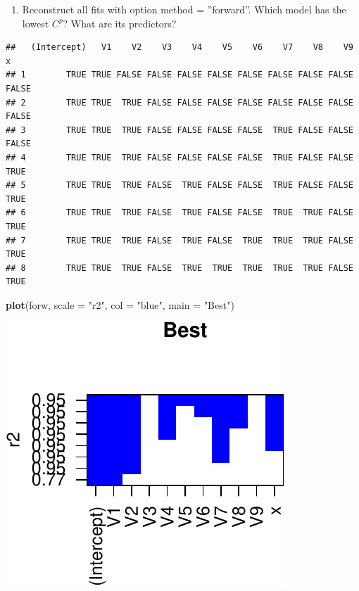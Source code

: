 \documentclass[]{article}
\newenvironment{Shaded}{\begin{snugshade}}{\end{snugshade}}
\newcommand{\DataTypeTok}[1]{\textcolor[rgb]{0.13,0.29,0.53}{#1}}
\newcommand{\KeywordTok}[1]{\textcolor[rgb]{0.13,0.29,0.53}{\textbf{#1}}}
\newcommand{\NormalTok}[1]{#1}
\newcommand{\OperatorTok}[1]{\textcolor[rgb]{0.81,0.36,0.00}{\textbf{#1}}}
\newcommand{\StringTok}[1]{\textcolor[rgb]{0.31,0.60,0.02}{#1}}
\providecommand{\tightlist}{%
  \setlength{\itemsep}{0pt}\setlength{\parskip}{0pt}}
\begin{document}
\begin{enumerate}
\def\labelenumi{(\alph{enumi})}
\setcounter{enumi}{2}
\tightlist
\item
  Reconstruct all fits with option method = ''forward''. Which model has
  the lowest \(C^p\)? What are its predictors?
\end{enumerate}

\begin{Shaded}
\end{Shaded}

\begin{verbatim}
##   (Intercept)   V1    V2    V3    V4    V5    V6    V7    V8    V9     x
## 1        TRUE TRUE FALSE FALSE FALSE FALSE FALSE FALSE FALSE FALSE FALSE
## 2        TRUE TRUE  TRUE FALSE FALSE FALSE FALSE FALSE FALSE FALSE FALSE
## 3        TRUE TRUE  TRUE FALSE FALSE FALSE FALSE  TRUE FALSE FALSE FALSE
## 4        TRUE TRUE  TRUE FALSE FALSE FALSE FALSE  TRUE FALSE FALSE  TRUE
## 5        TRUE TRUE  TRUE FALSE  TRUE FALSE FALSE  TRUE FALSE FALSE  TRUE
## 6        TRUE TRUE  TRUE FALSE  TRUE FALSE FALSE  TRUE  TRUE FALSE  TRUE
## 7        TRUE TRUE  TRUE FALSE  TRUE FALSE  TRUE  TRUE  TRUE FALSE  TRUE
## 8        TRUE TRUE  TRUE FALSE  TRUE  TRUE  TRUE  TRUE  TRUE FALSE  TRUE
\end{verbatim}

\begin{Shaded}
\begin{Highlighting}[]
\KeywordTok{plot}\NormalTok{(forw, }\DataTypeTok{scale =} \StringTok{"r2"}\NormalTok{, }\DataTypeTok{col =} \StringTok{"blue"}\NormalTok{, }\DataTypeTok{main =} \StringTok{"Best"}\NormalTok{)}
\end{Highlighting}
\end{Shaded}

\begin{center}\includegraphics{sol_A3_files/figure-latex/unnamed-chunk-24-1} \end{center}
\end{document}
